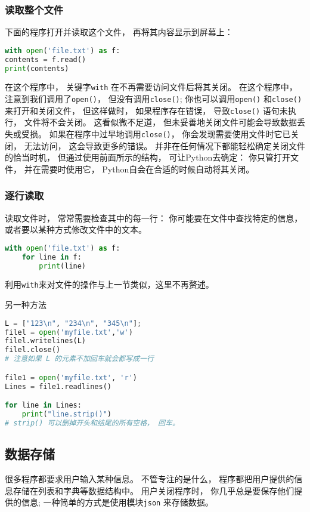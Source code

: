 \subsubsection{读取整个文件}
下面的程序打开并读取这个文件， 再将其内容显示到屏幕上：
\begin{lstlisting}[language=python]
with open('file.txt') as f:
contents = f.read()
print(contents)
\end{lstlisting}
在这个程序中， 关键字\verb`with` 在不再需要访问文件后将其关闭。 在这个程序中， 注意到我们调用了\verb`open()`， 但没有调用\verb`close()`; 你也可以调用\verb`open()` 和\verb`close()` 来打开和关闭文件， 但这样做时， 如果程序存在错误， 导致\verb`close()` 语句未执行， 文件将不会关闭。 这看似微不足道， 但未妥善地关闭文件可能会导致数据丢失或受损。 如果在程序中过早地调用\verb`close()`， 你会发现需要使用文件时它已关闭， 无法访问， 这会导致更多的错误。 并非在任何情况下都能轻松确定关闭文件的恰当时机， 但通过使用前面所示的结构， 可让Python去确定： 你只管打开文件， 并在需要时使用它， Python自会在合适的时候自动将其关闭。

\subsubsection{逐行读取}
读取文件时， 常常需要检查其中的每一行： 你可能要在文件中查找特定的信息， 或者要以某种方式修改文件中的文本。
\begin{lstlisting}[language=python]
with open('file.txt') as f:
    for line in f:
        print(line)
\end{lstlisting}

利用\verb`with`来对文件的操作与上一节类似，这里不再赘述。

另一种方法
\begin{lstlisting}[language=python]
L = ["123\n", "234\n", "345\n"];
filel = open('myfile.txt','w')
filel.writelines(L)
filel.close()
# 注意如果 L 的元素不加回车就会都写成一行

file1 = open('myfile.txt', 'r')
Lines = file1.readlines()

for line in Lines:
    print("line.strip()")
# strip() 可以删掉开头和结尾的所有空格， 回车。
\end{lstlisting}

\subsection{数据存储}
很多程序都要求用户输入某种信息。 不管专注的是什么， 程序都把用户提供的信息存储在列表和字典等数据结构中。  用户关闭程序时， 你几乎总是要保存他们提供的信息; 一种简单的方式是使用模块\verb`json` 来存储数据。

